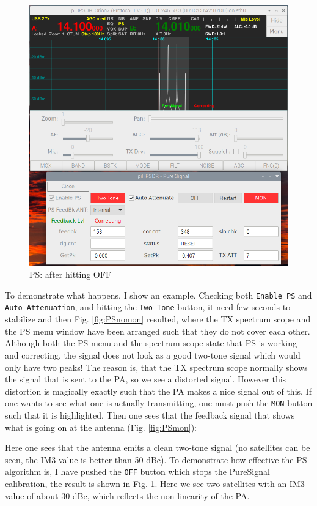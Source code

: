 \documentclass[12pt]{book}
\def\rett#1{\texttt{\color{red}#1}}
\begin{document}
\begin{figure}[t!]
\center
\includegraphics[width=12cm]{PSoff.png}
\caption{PS: after hitting OFF}
\label{fig:PSoff}
\end{figure}

To demonstrate what happens, I show an example. Checking both \rett{Enable PS} and
\rett{Auto Attenuation}, and hitting the \rett{Two Tone} button, it need few
seconds to stabilize and then Fig. \ref{fig:PSnomon} resulted, where the TX
spectrum scope and the PS menu window have been arranged such that they do
not cover each other. Although both the PS menu and the spectrum scope state
that PS is working and correcting, the signal does not look as a good two-tone
signal which would only have two peaks! The reason is, that the TX spectrum scope
normally shows the signal that is sent to the PA, so we see a distorted signal.
However this distortion is magically exactly such that the PA makes a nice signal
out of this. If one wants to see what one is actually transmitting, one must
push the \rett{MON} button such that it is highlighted. Then one sees that
the feedback signal that shows what is going on at the antenna (Fig. \ref{fig:PSmon}):



Here one sees that the antenna emits a clean two-tone signal (no satellites can be seen,
the IM3 value is better than 50 dBc). To demonstrate how effective the PS algorithm is,
I have pushed the \rett{OFF} button which stops the PureSignal calibration, the result
is shown in Fig. \ref{fig:PSoff}. Here we see two satellites with an IM3 value of
about 30 dBc, which reflects the non-linearity of the PA.
\end{document}
